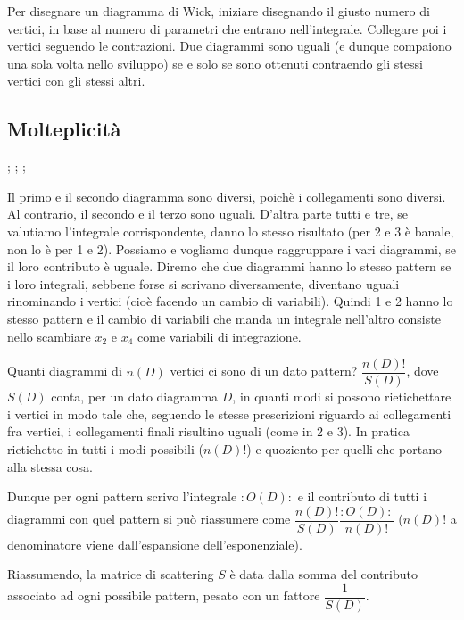 \documentclass[]{article}
\begin{document}
Per disegnare un diagramma di Wick, iniziare disegnando il giusto numero di vertici, in base al numero di parametri che entrano nell'integrale. Collegare poi i vertici seguendo le contrazioni. Due diagrammi sono uguali (e dunque compaiono una sola volta nello sviluppo) se e solo se sono ottenuti contraendo gli stessi vertici con gli stessi altri.

\subsection{Molteplicità}
;
;
;

Il primo e il secondo diagramma sono diversi, poichè i collegamenti sono diversi. Al contrario, il secondo e il terzo sono uguali. D'altra parte tutti e tre, se valutiamo l'integrale corrispondente, danno lo stesso risultato (per 2 e 3 è banale, non lo è per 1 e 2). Possiamo e vogliamo dunque raggruppare i vari diagrammi, se il loro contributo è uguale. Diremo che due diagrammi hanno lo stesso pattern se i loro integrali, sebbene forse si scrivano diversamente, diventano uguali rinominando i vertici (cioè facendo un cambio di variabili). Quindi 1 e 2 hanno lo stesso pattern e il cambio di variabili che manda un integrale nell'altro consiste nello scambiare $x_2$ e $x_4$ come variabili di integrazione.

Quanti diagrammi di $n(D)$ vertici ci sono di un dato pattern? $\dfrac{n(D)!}{S(D)}$, dove $S(D)$ conta, per un dato diagramma $D$, in quanti modi si possono rietichettare i vertici in modo tale che, seguendo le stesse prescrizioni riguardo ai collegamenti fra vertici, i collegamenti finali risultino uguali (come in 2 e 3). In pratica rietichetto in tutti i modi possibili ($n(D)!$) e quoziento per quelli che portano alla stessa cosa.

Dunque per ogni pattern scrivo l'integrale $:O(D):$ e il contributo di tutti i diagrammi con quel pattern si può riassumere come $\dfrac{n(D)!}{S(D)}\dfrac{:O(D):}{n(D)!}$ ($n(D)!$ a denominatore viene dall'espansione dell'esponenziale).

Riassumendo, la matrice di scattering $S$ è data dalla somma del contributo associato ad ogni possibile pattern, pesato con un fattore $\dfrac{1}{S(D)}$.
\end{document}

